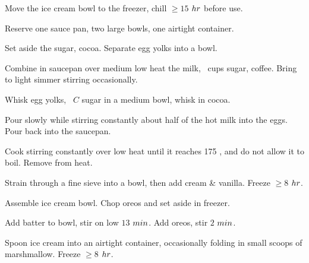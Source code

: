 \begin{preparation}
\item Move the ice cream bowl to the freezer, chill $\ge15$ $\hour$ before use.

\item Reserve one sauce pan, two large bowls, one airtight container.

\item Set aside the sugar, cocoa.
	Separate egg yolks into a bowl.

\item Combine in saucepan over medium low heat the milk, \onehalf~cups sugar, coffee.
	Bring to light simmer stirring occasionally.

\item Whisk egg yolks, \onefourth~$C$ sugar in a medium bowl, whisk in cocoa.

\item Pour slowly while stirring constantly about half of the hot milk into the eggs.
	Pour back into the saucepan.

\item Cook stirring constantly over low heat until it reaches 175 \Fahrenheit, and do not allow it to boil.
	Remove from heat.

\item Strain through a fine sieve into a bowl, then add cream \& vanilla.
	Freeze $\ge8$ $\hour$.

\item Assemble ice cream bowl.
	Chop oreos and set aside in freezer.

\item Add batter to bowl, stir on low $13$ $\minute$.
	Add oreos, stir $2$ $\minute$.

\item Spoon ice cream into an airtight container, occasionally folding in small scoops of marshmallow.
	Freeze $\ge8$ $\hour$.
\end{preparation}


\recipeend
